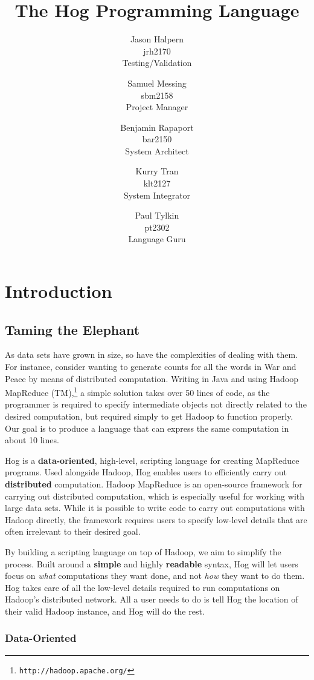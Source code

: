 \documentclass{book}
\title{\huge \textbf{The Hog Programming Language}}
\author{Jason Halpern \\ jrh2170 \\ Testing/Validation
        \and Samuel Messing \\ sbm2158 \\ Project Manager
        \and Benjamin Rapaport \\ bar2150 \\ System Architect
        \and Kurry Tran \\ klt2127 \\ System Integrator
        \and Paul Tylkin \\ pt2302 \\ Language Guru}
\begin{document}
\maketitle

\tableofcontents

\chapter{Introduction}
\label{chap:intro}

\section{Taming the Elephant}
\label{sec:elephant}

As data sets have grown in size, so have the complexities of dealing with them.
For instance, consider wanting to generate counts for all the words in War and
Peace by means of distributed computation. Writing in Java and using Hadoop
MapReduce (TM),\footnote{\texttt{http://hadoop.apache.org/}} a simple solution
takes over 50 lines of code, as the programmer is required to specify
intermediate objects not directly related to the desired computation, but
required simply to get Hadoop to function properly. Our goal is to produce a
language that can express the same computation in about 10 lines.

Hog is a \textbf{data-oriented}, high-level, scripting language for creating
MapReduce\cite{dean:2004} programs. Used alongside Hadoop, Hog enables users to
efficiently carry out \textbf{distributed} computation. Hadoop MapReduce is an
open-source framework for carrying out distributed computation, which is
especially useful for working with large data sets. While it is possible to
write code to carry out computations with Hadoop directly, the framework
requires users to specify low-level details that are often irrelevant to their
desired goal. 


By building a scripting language on top of Hadoop, we aim to simplify the
process. Built around a \textbf{simple} and highly \textbf{readable} syntax,
Hog will let users focus on \emph{what} computations they want done, and not
\emph{how} they want to do them.  Hog takes care of all the low-level details
required to run computations on Hadoop’s distributed network. All a user needs
to do is tell Hog the location of their valid Hadoop instance, and Hog will do
the rest.

\subsection{Data-Oriented}
\label{sub:data-oriented}
\end{document}
